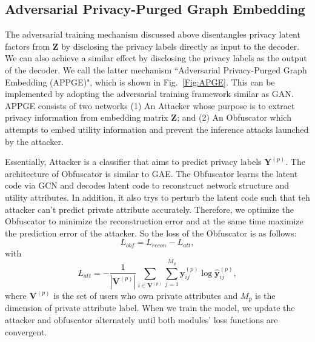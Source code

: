 \documentclass{article}
\begin{document}
\subsection{Adversarial Privacy-Purged Graph Embedding}
The adversarial training mechanism discussed above disentangles privacy latent factors from $\mathbf{Z}$ by disclosing the privacy labels directly as input to the decoder. We can also achieve a similar effect by disclosing the privacy labels as the output of the decoder. We call the latter mechanism ``Adversarial Privacy-Purged Graph Embedding (APPGE)", which is shown in Fig.~\ref{Fig:APGE}. This can be implemented by adopting the adversarial training framework similar as GAN. APPGE consists of two networks (1) An Attacker  whose purpose is to extract privacy information from embedding matrix $\mathbf{Z}$; and (2) An Obfuscator which attempts to embed utility information and prevent the inference attacks launched by the attacker.


Essentially, Attacker is a classifier that aims to predict privacy labels $\mathbf{Y}^{(p)}$. The architecture of Obfuscator is similar to GAE. The Obfuscator learns the latent code via GCN and decodes latent code to reconstruct network structure and utility attributes. In addition, it also trys to perturb the latent code such that teh attacker can't predict private attribute accurately. Therefore, we optimize the Obfuscator to minimize the reconstruction error and at the same time maximize the prediction error of the attacker. So the loss of the Obfuscator is as follows:
\begin{equation}
L_{obf} = L_{recon} - L_{att},
\label{Eq:obf}
\end{equation}
with
\begin{equation}
L_{att} =  -\frac{1}{|\mathbf{V}^{(p)}|}\sum_{i \in \mathbf{V}^{(p)}}\sum_{j=1}^{M_p}\mathbf{y}^{(p)}_{ij}\log\mathbf{\hat{y}}^{(p)}_{ij},
\end{equation}
where $\mathbf{V}^{(p)}$ is the set of users who own private attributes and $M_p$ is the dimension of private attribute label.
When we train the model, we update the attacker and obfuscator alternately until  both modules' loss functions are convergent.
\end{document}
